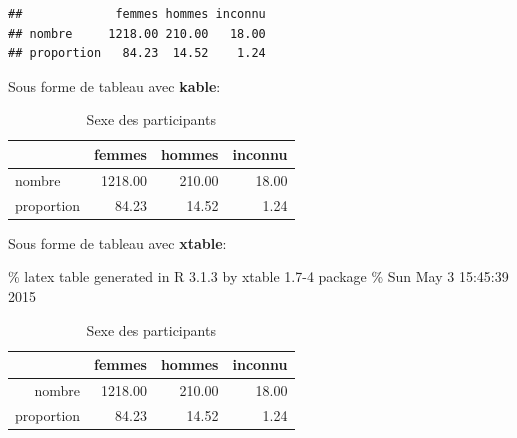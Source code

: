 \documentclass[]{article}
\newenvironment{Shaded}{\begin{snugshade}}{\end{snugshade}}
\newcommand{\KeywordTok}[1]{\textcolor[rgb]{0.13,0.29,0.53}{\textbf{{#1}}}}
\newcommand{\DataTypeTok}[1]{\textcolor[rgb]{0.13,0.29,0.53}{{#1}}}
\newcommand{\DecValTok}[1]{\textcolor[rgb]{0.00,0.00,0.81}{{#1}}}
\newcommand{\StringTok}[1]{\textcolor[rgb]{0.31,0.60,0.02}{{#1}}}
\newcommand{\NormalTok}[1]{{#1}}
\begin{document}
\begin{Shaded}
\end{Shaded}

\begin{verbatim}
##             femmes hommes inconnu
## nombre     1218.00 210.00   18.00
## proportion   84.23  14.52    1.24
\end{verbatim}

Sous forme de tableau avec \textbf{kable}:

\begin{table}

\caption{Sexe des participants}
\begin{tabular}{l|r|r|r}
\hline
  & femmes & hommes & inconnu\\
\hline
nombre & 1218.00 & 210.00 & 18.00\\
\hline
proportion & 84.23 & 14.52 & 1.24\\
\hline
\end{tabular}
\end{table}

Sous forme de tableau avec \textbf{xtable}:

\% latex table generated in R 3.1.3 by xtable 1.7-4 package \% Sun May 3
15:45:39 2015

\begin{table}[ht]
\centering
\begin{tabular}{rrrr}
  \hline
 & femmes & hommes & inconnu \\ 
  \hline
nombre & 1218.00 & 210.00 & 18.00 \\ 
  proportion & 84.23 & 14.52 & 1.24 \\ 
   \hline
\end{tabular}
\caption{Sexe des participants} 
\label{sexe}
\end{table}
\end{document}
